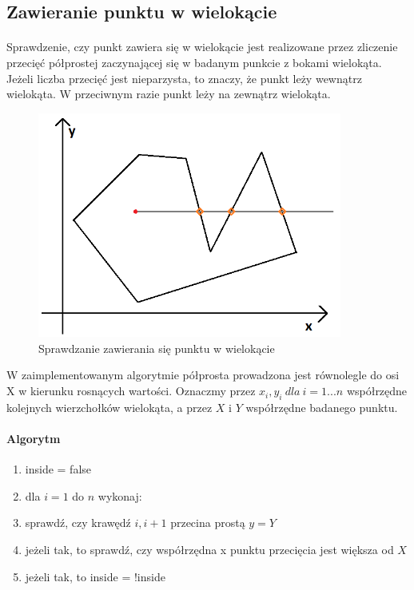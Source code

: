 \documentclass{article}
\newcommand{\tab}[1]{\hspace{.05\textwidth}\rlap{#1}}
\begin{document}
\subsection{Zawieranie punktu w wielokącie}

\paragraph{}
Sprawdzenie, czy punkt zawiera się w wielokącie jest realizowane przez zliczenie przecięć półprostej zaczynającej się w badanym punkcie z bokami wielokąta. Jeżeli liczba przecięć jest nieparzysta, to znaczy, że punkt leży wewnątrz wielokąta. W przeciwnym razie punkt leży na zewnątrz wielokąta.


\begin{figure}[H]
    \centering
    \includegraphics[width=10cm]{zawieranie.png}
    \caption{Sprawdzanie zawierania się punktu w wielokącie}
    \label{fig:zawieranie}
\end{figure}

W zaimplementowanym algorytmie półprosta prowadzona jest równolegle do osi X w kierunku rosnących wartości. Oznaczmy przez \(x_i, y_i\ dla\ i=1...n\) współrzędne kolejnych wierzchołków wielokąta, a przez \(X\) i \(Y\) współrzędne badanego punktu.

\paragraph{Algorytm}
\begin{enumerate}
\item inside = false
\item dla \(i=1\) do \(n\) wykonaj: 
\item \tab \tab sprawdź, czy krawędź \(i, i+1\) przecina prostą \(y=Y\)
\item \tab \tab jeżeli tak, to sprawdź, czy współrzędna x punktu przecięcia jest większa od \(X\)
\item \tab \tab jeżeli tak, to inside = !inside
\end{enumerate}
\end{document}
